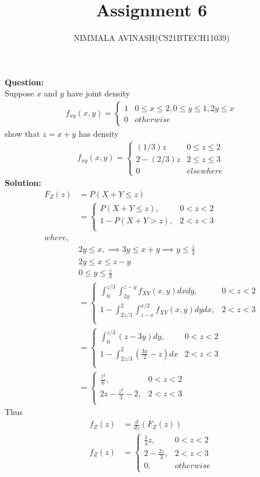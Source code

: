 \documentclass[journal,twocolumn]{IEEEtran}
\title{Assignment 6}
\author{NIMMALA AVINASH(CS21BTECH11039)}
\begin{document}
\maketitle

{\LARGE \textbf{Question:\\}}
Suppose $ x $ and $ y $ have joint density
\begin{align}
f_{xy}(x,y)=\begin{cases}
1 &0\leq x\leq 2,0\leq y\leq 1,2y \leq x\\
0 &otherwise
\end{cases}
\end{align}
show that $ z = x+y $ has density
\begin{align}
f_{xy}(x,y) = \begin{cases}
(1/3)z &0\leq z\leq 2\\
2-(2/3)z &2\leq z\leq 3\\
0 &elsewhere
\end{cases}
\end{align}
{\LARGE \textbf{Solution:}}
\begin{align}
F_{Z}(z) &= P(X+Y \leq z)\\
&=\begin{cases}
P(X+Y\leq z), &0 < z < 2\\
1-P(X+Y>z), &2 < z < 3\\
\end{cases}\\
where,\\
 &2y\leq x ,\implies3y\leq x+y \implies y \leq \frac{z}{3}\\
 & 2y \leq x \leq z-y\\
 & 0 \leq y \leq \frac{z}{3}\\
&=\begin{cases}
\int_{0}^{z/3} \int_{2y}^{z-y}f_{XY}(x,y) dx dy  , &0 < z < 2\\
1-\int_{2z/3}^{2} \int_{z-x}^{x/2}f_{XY}(x,y) dy dx , &2 < z < 3\\
\end{cases}\\
&=\begin{cases}
\int_{0}^{z/3}(z-3y)dy , &0 < z < 2\\
1-\int_{2z/3}^{2}(\frac{3x}{2}-z)dx &2 < z < 3\\
\end{cases}\\
&=\begin{cases}
\frac{z^{2}}{6}, &0 < z < 2\\
2z-\frac{z^{2}}{3}-2,&2 < z < 3\\
\end{cases}
\end{align}
Thus\\
\begin{align}
f_{Z}(z)&=\frac{d}{dz}(F_{Z}(z))\\
f_{Z}(z)&=\begin{cases}
\frac{1}{3}z,&0 < z < 2\\
2-\frac{2z}{3},&2 < z < 3\\
0,&otherwise
\end{cases}
\end{align}
\end{document}
